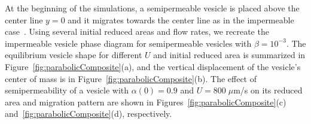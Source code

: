 \documentclass[prb,preprint,showpacs,preprintnumbers,amsmath,amssymb,longbibliography]{revtex4-1}
\begin{document}
%
%
%
%
%
%

At the beginning of the simulations, a semipermeable vesicle is placed
above the center line $y=0$ and it migrates towards the center line as
in the impermeable case~\cite{dan-vla-mis2009}. 
%
%
%
Using several initial reduced areas and flow rates, we recreate the
impermeable vesicle phase diagram for semipermeable vesicles with $\beta
= 10^{-3}$. The equilibrium vesicle shape for different $U$ and initial
reduced area is summarized in Figure~\ref{fig:parabolicComposite}(a),
and the vertical displacement of the vesicle's center of mass is in
Figure~\ref{fig:parabolicComposite}(b). The effect of semipermeability
of a vesicle with $\alpha(0) = 0.9$ and $U=800\; \mu$m/s on its reduced
area and migration pattern are shown in
Figures~\ref{fig:parabolicComposite}(c)
and~\ref{fig:parabolicComposite}(d), respectively. 
\end{document}
